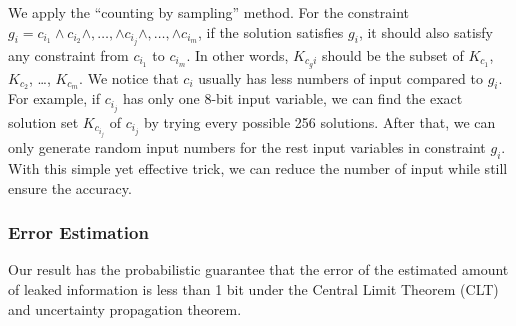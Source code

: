 We apply the ``counting by sampling'' method. For
the constraint $g_{i}= c_{i_1} \land c_{i_2} \land ,\ldots, \land c_{i_j} \land
,\ldots, \land c_{i_m}$, if the solution satisfies $g_{i}$, it should also
satisfy any constraint from $c_{i_1}$ to $c_{i_m}$. In other words, $K_{c_gi}$
should be the subset of $K_{c_1}$, $K_{c_2}$, \ldots , $K_{c_m}$. We notice that
$c_i$ usually has less numbers of input compared to $g_{i}$. For example, if
$c_{i_j}$ has only one 8-bit input variable, we can find the exact solution set
$K_{c_{i_j}}$ of $c_{i_j}$ by trying every possible 256 solutions. After that,
we can only generate random input numbers for the rest input variables in
constraint $g_{i}$. With this simple yet effective trick, we can reduce the number of input
while still ensure the accuracy.




\subsubsection{Error Estimation}
\label{sssec:errest}
Our result has the probabilistic guarantee that the error of the estimated amount of leaked 
information is less than 1 bit under the Central Limit Theorem (CLT) and uncertainty
propagation theorem.

